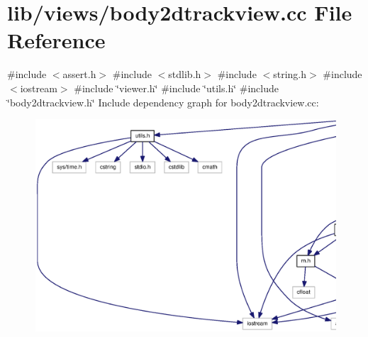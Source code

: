 \section{lib/views/body2dtrackview.cc \-File \-Reference}
\label{body2dtrackview_8cc}
{\ttfamily \#include $<$assert.\-h$>$}\*
{\ttfamily \#include $<$stdlib.\-h$>$}\*
{\ttfamily \#include $<$string.\-h$>$}\*
{\ttfamily \#include $<$iostream$>$}\*
{\ttfamily \#include \char`\"{}viewer.\-h\char`\"{}}\*
{\ttfamily \#include \char`\"{}utils.\-h\char`\"{}}\*
{\ttfamily \#include \char`\"{}body2dtrackview.\-h\char`\"{}}\*
\-Include dependency graph for body2dtrackview.\-cc\-:
\nopagebreak
\begin{figure}[H]
\begin{center}
\leavevmode
\includegraphics[width=350pt]{body2dtrackview_8cc__incl}
\end{center}
\end{figure}
